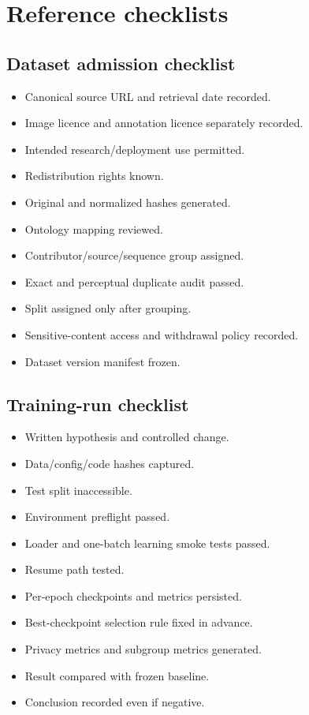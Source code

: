 \chapter{Reference checklists}

\section{Dataset admission checklist}

\begin{itemize}[label=$\square$,leftmargin=8mm]
  \item Canonical source URL and retrieval date recorded.
  \item Image licence and annotation licence separately recorded.
  \item Intended research/deployment use permitted.
  \item Redistribution rights known.
  \item Original and normalized hashes generated.
  \item Ontology mapping reviewed.
  \item Contributor/source/sequence group assigned.
  \item Exact and perceptual duplicate audit passed.
  \item Split assigned only after grouping.
  \item Sensitive-content access and withdrawal policy recorded.
  \item Dataset version manifest frozen.
\end{itemize}

\section{Training-run checklist}

\begin{itemize}[label=$\square$,leftmargin=8mm]
  \item Written hypothesis and controlled change.
  \item Data/config/code hashes captured.
  \item Test split inaccessible.
  \item Environment preflight passed.
  \item Loader and one-batch learning smoke tests passed.
  \item Resume path tested.
  \item Per-epoch checkpoints and metrics persisted.
  \item Best-checkpoint selection rule fixed in advance.
  \item Privacy metrics and subgroup metrics generated.
  \item Result compared with frozen baseline.
  \item Conclusion recorded even if negative.
\end{itemize}

